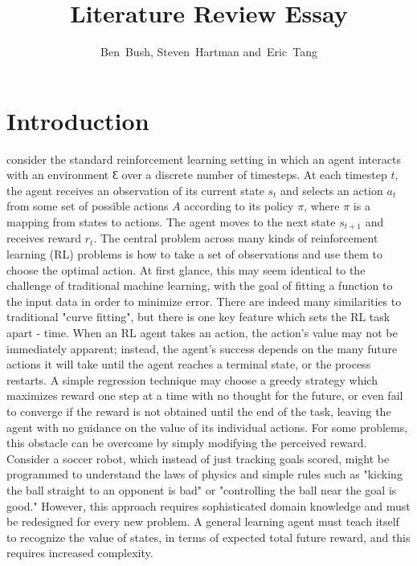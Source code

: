 \documentclass[journal,onecolumn]{IEEEtran}
\begin{document}
\title{Literature Review Essay}


\author{Ben~Bush,
        Steven~Hartman
        and~Eric~Tang%
        }

\section{Introduction}
% 
% 
% 
% 
 consider the standard reinforcement learning setting in which an agent interacts with an environment $Ɛ$ over a discrete number of timesteps. At each timestep $t$, the agent receives an observation of its current state $s_{t}$  and selects an action $a_{t}$  from some set of possible actions $A$ according to its policy $\pi$, where $\pi$ is a mapping from states to actions. The agent moves to the next state $s_{t+1}$ and receives reward $r_{t}$. The central problem across many kinds of reinforcement learning (RL) problems is how to take a set of observations and use them to choose the optimal action.  At first glance, this may seem identical to the challenge of traditional machine learning, with the goal of fitting a function to the input data in order to minimize error.  There are indeed many similarities to traditional "curve fitting", but there is one key feature which sets the RL task apart - time.  When an RL agent takes an action, the action's value may not be immediately apparent; instead, the agent's success depends on the many future actions it will take until the agent reaches a terminal state, or the process restarts.  A simple regression technique may choose a greedy strategy which maximizes reward one step at a time with no thought for the future, or even fail to converge if the reward is not obtained until the end of the task, leaving the agent with no guidance on the value of its individual actions.  For some problems, this obstacle can be overcome by simply modifying the perceived reward. Consider a soccer robot, which instead of just tracking goals scored, might be programmed to understand the laws of physics and simple rules such as "kicking the ball straight to an opponent is bad" or "controlling the ball near the goal is good."  However, this approach requires sophisticated domain knowledge and must be redesigned for every new problem.  A general learning agent must teach itself to recognize the value of states, in terms of expected total future reward, and this requires increased complexity.
\end{document}
